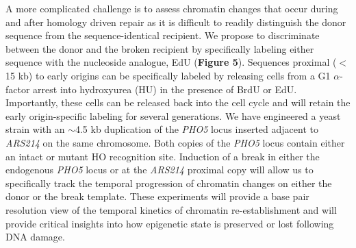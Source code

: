 A more complicated challenge is to assess chromatin changes that occur during and after homology driven repair as %
it is difficult to readily distinguish the donor sequence from the sequence-identical recipient. 
We propose to discriminate between the donor and the broken recipient by specifically labeling either sequence with the nucleoside analogue, EdU ({\color{dukeblue}\textbf{Figure 5}}). Sequences proximal ($<$15 kb) to early origins can be specifically labeled %
by releasing cells from a G1 $\alpha$-factor arrest into hydroxyurea (HU) in the presence of BrdU or EdU\citep{Peace2016-rb,Belsky2015-li}.  Importantly, these cells can be released back into the cell cycle and will retain the early origin-specific labeling for several generations.  We have engineered a yeast strain with an $\sim$4.5 kb duplication of the  \textit{PHO5} locus inserted adjacent to  \textit{ARS214} on the same chromosome.  Both copies of the \textit{PHO5} locus contain either an intact or mutant HO recognition site. Induction of a break in either the endogenous \textit{PHO5} locus or at the \textit{ARS214} proximal copy will allow us to specifically track the temporal progression of chromatin changes on either the donor or the break template.  These experiments will provide a base pair resolution view of the temporal kinetics of chromatin re-establishment and will provide critical insights into how epigenetic state is preserved or lost following DNA damage.
